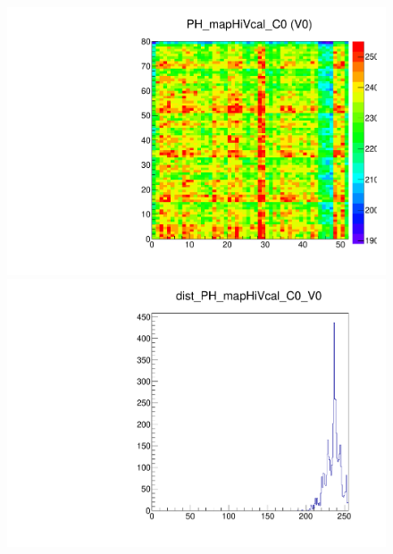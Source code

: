\begin{figure}[!Hp]
\centering
\begin{minipage}{0.45\textwidth}
  \includegraphics[width=1.0\textwidth]{figures/phopt_PH_mapHiVcal.pdf}
  \caption{}
  \label{fig:phopt_PH_mapHiVcal}
\end{minipage}
\hspace{0.3cm}
\begin{minipage}{0.45\textwidth}
  \includegraphics[width=1.0\textwidth]{figures/phopt_dist_PH_mapHiVcal.pdf}
  \caption{}
  \label{fig:phopt_dist_PH_mapHiVcal}
\end{minipage}
\end{figure}


